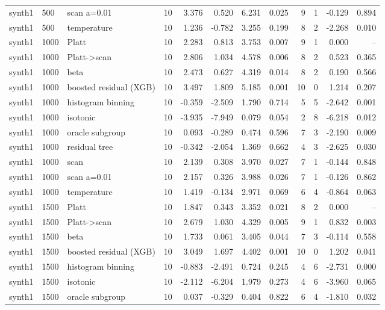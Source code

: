 \begin{tabular}{lllrrrrrrrrr}
synth1 & 500 & scan a=0.01 & 10 & 3.376 & 0.520 & 6.231 & 0.025 & 9 & 1 & -0.129 & 0.894 \\
synth1 & 500 & temperature & 10 & 1.236 & -0.782 & 3.255 & 0.199 & 8 & 2 & -2.268 & 0.010 \\
synth1 & 1000 & Platt & 10 & 2.283 & 0.813 & 3.753 & 0.007 & 9 & 1 & 0.000 & -- \\
synth1 & 1000 & Platt->scan & 10 & 2.806 & 1.034 & 4.578 & 0.006 & 8 & 2 & 0.523 & 0.365 \\
synth1 & 1000 & beta & 10 & 2.473 & 0.627 & 4.319 & 0.014 & 8 & 2 & 0.190 & 0.566 \\
synth1 & 1000 & boosted residual (XGB) & 10 & 3.497 & 1.809 & 5.185 & 0.001 & 10 & 0 & 1.214 & 0.207 \\
synth1 & 1000 & histogram binning & 10 & -0.359 & -2.509 & 1.790 & 0.714 & 5 & 5 & -2.642 & 0.001 \\
synth1 & 1000 & isotonic & 10 & -3.935 & -7.949 & 0.079 & 0.054 & 2 & 8 & -6.218 & 0.012 \\
synth1 & 1000 & oracle subgroup & 10 & 0.093 & -0.289 & 0.474 & 0.596 & 7 & 3 & -2.190 & 0.009 \\
synth1 & 1000 & residual tree & 10 & -0.342 & -2.054 & 1.369 & 0.662 & 4 & 3 & -2.625 & 0.030 \\
synth1 & 1000 & scan & 10 & 2.139 & 0.308 & 3.970 & 0.027 & 7 & 1 & -0.144 & 0.848 \\
synth1 & 1000 & scan a=0.01 & 10 & 2.157 & 0.326 & 3.988 & 0.026 & 7 & 1 & -0.126 & 0.862 \\
synth1 & 1000 & temperature & 10 & 1.419 & -0.134 & 2.971 & 0.069 & 6 & 4 & -0.864 & 0.063 \\
synth1 & 1500 & Platt & 10 & 1.847 & 0.343 & 3.352 & 0.021 & 8 & 2 & 0.000 & -- \\
synth1 & 1500 & Platt->scan & 10 & 2.679 & 1.030 & 4.329 & 0.005 & 9 & 1 & 0.832 & 0.003 \\
synth1 & 1500 & beta & 10 & 1.733 & 0.061 & 3.405 & 0.044 & 7 & 3 & -0.114 & 0.558 \\
synth1 & 1500 & boosted residual (XGB) & 10 & 3.049 & 1.697 & 4.402 & 0.001 & 10 & 0 & 1.202 & 0.041 \\
synth1 & 1500 & histogram binning & 10 & -0.883 & -2.491 & 0.724 & 0.245 & 4 & 6 & -2.731 & 0.000 \\
synth1 & 1500 & isotonic & 10 & -2.112 & -6.204 & 1.979 & 0.273 & 4 & 6 & -3.960 & 0.065 \\
synth1 & 1500 & oracle subgroup & 10 & 0.037 & -0.329 & 0.404 & 0.822 & 6 & 4 & -1.810 & 0.032 \\

\end{tabular}
